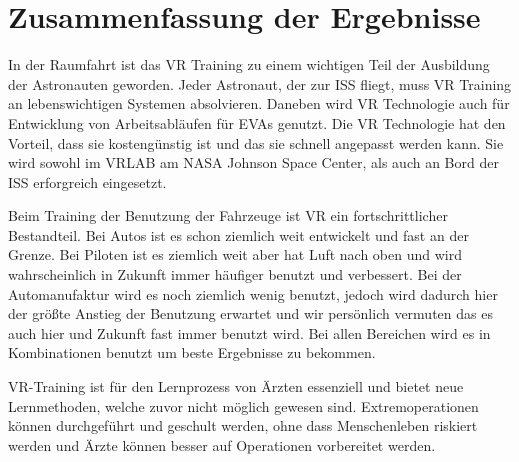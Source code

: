 \section{Zusammenfassung der Ergebnisse}
In der Raumfahrt ist das VR Training zu einem wichtigen Teil der Ausbildung der Astronauten geworden.
Jeder Astronaut, der zur ISS fliegt, muss VR Training an lebenswichtigen Systemen absolvieren. Daneben wird VR Technologie auch für Entwicklung von Arbeitsabläufen für EVAs genutzt.
Die VR Technologie hat den Vorteil, dass sie kostengünstig ist und das sie schnell angepasst werden kann. Sie wird sowohl im VRLAB am NASA Johnson Space Center, als auch an Bord der ISS erforgreich eingesetzt.

Beim Training der Benutzung der Fahrzeuge ist VR ein fortschrittlicher Bestandteil.
Bei Autos ist es schon ziemlich weit entwickelt und fast an der Grenze. Bei Piloten ist es ziemlich weit aber hat Luft nach oben und wird wahrscheinlich in Zukunft immer häufiger benutzt und verbessert.
Bei der Automanufaktur wird es noch ziemlich wenig benutzt, jedoch wird dadurch hier der größte Anstieg der Benutzung erwartet und wir persönlich vermuten das es auch hier und Zukunft fast immer benutzt wird.
Bei allen Bereichen wird es in Kombinationen benutzt um beste Ergebnisse zu bekommen.

VR-Training ist für den Lernprozess von Ärzten essenziell und bietet neue Lernmethoden, welche zuvor nicht möglich gewesen sind. Extremoperationen können durchgeführt und geschult werden, ohne dass Menschenleben riskiert werden und Ärzte können besser auf Operationen vorbereitet werden.
